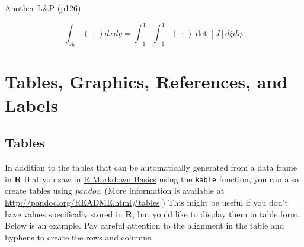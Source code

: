 \documentclass[12pt,twoside]{dukestatscithesis}
\theoremstyle{definition}
\theoremstyle{definition}
\theoremstyle{definition}
\theoremstyle{remark}
\begin{document}
Another L\&P (p126)

\[
\int_{A_e} (\,\cdot\,) dx dy = \int_{-1}^1\!\int_{-1}^1 (\,\cdot\,) \det[J] d\xi d\eta.
\]

\chapter{Tables, Graphics, References, and Labels}\label{ref-labels}

\section{Tables}\label{tables}

In addition to the tables that can be automatically generated from a
data frame in \textbf{R} that you saw in
\protect\hyperlink{rmd-basics}{R Markdown Basics} using the
\texttt{kable} function, you can also create tables using \emph{pandoc}.
(More information is available at
\url{http://pandoc.org/README.html\#tables}.) This might be useful if
you don't have values specifically stored in \textbf{R}, but you'd like
to display them in table form. Below is an example. Pay careful
attention to the alignment in the table and hyphens to create the rows
and columns.
\end{document}
